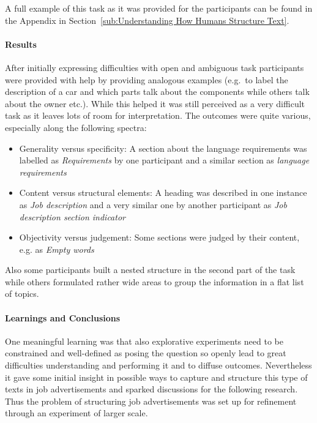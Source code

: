 A full example of this task as it was provided for the participants can be found in the Appendix in Section~\ref{sub:Understanding How Humans Structure Text}.

\paragraph{Results}
\label{par:Results}

After initially expressing difficulties with open and ambiguous task participants were provided with help by providing analogous examples (e.g.\ to label the description of a car and which parts talk about the components while others talk about the owner etc.). While this helped it was still perceived as a very difficult task as it leaves lots of room for interpretation.
The outcomes were quite various, especially along the following spectra:

\begin{itemize}
  \item Generality versus specificity: A section about the language requirements was labelled as \emph{Requirements} by one participant and a similar section as \emph{language requirements}
  \item Content versus structural elements: A heading was described in one instance as \emph{Job description} and a very similar one by another participant as \emph{Job description section indicator}
  \item Objectivity versus judgement: Some sections were judged by their content, e.g. as \emph{Empty words}
\end{itemize}

Also some participants built a nested structure in the second part of the task while others formulated rather wide areas to group the information in a flat list of topics.

\paragraph{Learnings and Conclusions}
\label{par:Learnings and Conclusions}

One meaningful learning was that also explorative experiments need to be constrained and well-defined as posing the question so openly lead to great difficulties understanding and performing it and to diffuse outcomes. Nevertheless it gave some initial insight in possible ways to capture and structure this type of texts in job advertisements and sparked discussions for the following research. Thus the problem of structuring job advertisements was set up for refinement through an experiment of larger scale.

